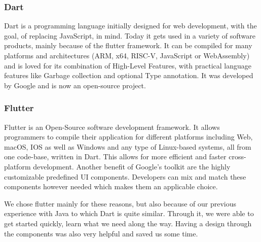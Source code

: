 \Author{\daAuthorTwo}

\subsubsection{Dart}
Dart is a programming language initially designed for web development, with the goal, of replacing JavaScript, in mind. Today it gets used in a variety of software products, mainly because of the flutter framework. It can be compiled for many platforms and architectures (ARM, x64, RISC-V, JavaScript or WebAssembly) and is loved for its combination of High-Level Features, with practical language features like Garbage collection and optional Type annotation. It was developed by Google and is now an open-source project.

\blankLine

\autocite{BibEntry}

\subsubsection{Flutter}
Flutter is an Open-Source software development framework. It allows programmers to compile their application for different platforms including Web, macOS, IOS as well as Windows and any type of Linux-based systems, all from one code-base, written in Dart. This allows for more efficient and faster cross-platform development. Another benefit of Google's toolkit are the highly customizable predefined UI components. Developers can mix and match these components however needed which makes them an applicable choice.

\blankLine

We chose flutter mainly for these reasons, but also because of our previous experience with Java to which Dart is quite similar. Through it, we were able to get started quickly, learn what we need along the way. Having a design through the components was also very helpful and saved us some time. 

\blankLine

\autocite{flutterReadMe}
\autocite{dagne2019flutter}
\newpage